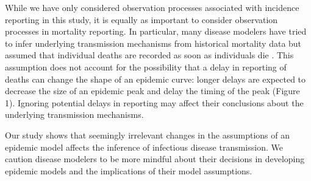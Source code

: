 \documentclass{article}\usepackage[]{graphicx}\usepackage[]{color}
\begin{document}
While we have only considered observation processes associated with incidence 
reporting in this study, it is equally as important to consider observation
processes in mortality reporting. In particular, many disease modelers have
tried to infer underlying transmission mechanisms from historical mortality 
data but assumed that individual deaths are recorded as soon as individuals die 
\citep{he2013inferring, didelot2017model, dean2018human}. 
This assumption does not account for the possibility 
that a delay in reporting of deaths can
change the shape of an epidemic curve: longer delays are expected to decrease
the size of an epidemic peak and delay the timing of the peak (Figure 1). 
Ignoring potential delays in reporting may affect their conclusions about the underlying 
transmission mechanisms.

Our study shows that seemingly irrelevant changes in the assumptions of an epidemic
model affects the inference of infectious disease transmission.
We caution disease modelers to be more mindful about their decisions in developing
epidemic models and the implications of their model assumptions.


\end{document}
